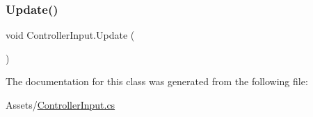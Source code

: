 \subsubsection{\texorpdfstring{Update()}{Update()}}
{\footnotesize\ttfamily void Controller\+Input.\+Update (\begin{DoxyParamCaption}{ }\end{DoxyParamCaption})\hspace{0.3cm}{\ttfamily [private]}}



The documentation for this class was generated from the following file\+:\begin{DoxyCompactItemize}
\item 
Assets/\hyperlink{_controller_input_8cs}{Controller\+Input.\+cs}\end{DoxyCompactItemize}
